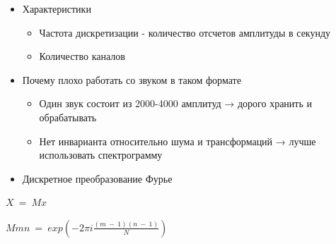 \documentclass[a4paper, 12pt]{article}
\begin{document}
\begin{itemize}
\item
  
  {Характеристики}
  

  \begin{itemize}
  \item
    
    Частота дискретизации - количество отсчетов амплитуды в секунду
    
  \item
    
    Количество каналов
    
  \end{itemize}
\item Почему плохо работать со звуком в таком формате
  

  \begin{itemize}
  \item
    
    Один звук состоит из 2000-4000 амплитуд → дорого хранить и
    обрабатывать
    
  \item
    
    Нет инварианта относительно шума и трансформаций → лучше
    использовать спектрограмму
    
  \end{itemize}
\item
  
  {Дискретное преобразование Фурье}
  
\end{itemize}


\(X\  = \ Mx\)

\(Mmn\  = \ exp( - 2\pi i\frac{(m\  - \ 1)(n\  - \ 1)}{N})\)
\end{document}
